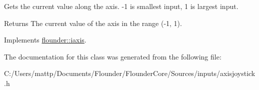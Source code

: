 Gets the current value along the axis. -\/1 is smallest input, 1 is largest input. 

\begin{DoxyReturn}{Returns}
The current value of the axis in the range (-\/1, 1). 
\end{DoxyReturn}


Implements \hyperlink{classflounder_1_1iaxis_a067a133edfde2ee8e2689df71328bf03}{flounder\+::iaxis}.



The documentation for this class was generated from the following file\+:\begin{DoxyCompactItemize}
\item 
C\+:/\+Users/mattp/\+Documents/\+Flounder/\+Flounder\+Core/\+Sources/inputs/axisjoystick.\+h\end{DoxyCompactItemize}

